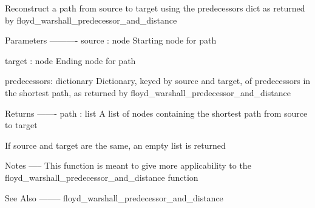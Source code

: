 \begin{DoxyVerb}Reconstruct a path from source to target using the predecessors
dict as returned by floyd_warshall_predecessor_and_distance

Parameters
----------
source : node
   Starting node for path

target : node
   Ending node for path

predecessors: dictionary
   Dictionary, keyed by source and target, of predecessors in the
   shortest path, as returned by floyd_warshall_predecessor_and_distance

Returns
-------
path : list
   A list of nodes containing the shortest path from source to target

   If source and target are the same, an empty list is returned

Notes
-----
This function is meant to give more applicability to the
floyd_warshall_predecessor_and_distance function

See Also
--------
floyd_warshall_predecessor_and_distance
\end{DoxyVerb}
 